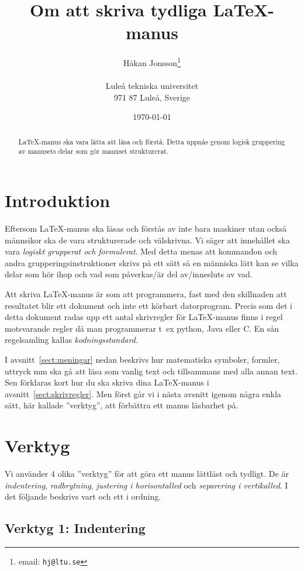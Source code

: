 \documentclass[a4paper,12pt]{article}
\title{Om att skriva tydliga \LaTeX-manus}
\author{Håkan Jonsson\thanks{email: \texttt{hj@ltu.se}} \\  
        ~ \\
        Luleå tekniska universitet \\ 
        971 87 Luleå, Sverige}
\date{\today}
\begin{document}
\linenumbers

\maketitle

\begin{abstract}
    \LaTeX-manus ska vara lätta att läsa och förstå. Detta uppnås genom
    logisk gruppering av manusets delar som gör manuset strukturerat. 
\end{abstract}

\section{Introduktion}

Eftersom \LaTeX-manus ska läsas och förstås av inte bara maskiner utan
också männsikor ska de vara strukturerade och välskrivna. Vi säger att
innehållet ska vara \emph{logiskt grupperat och formulerat}. Med detta
menas att kommandon och andra grupperingsinstruktioner skrivs på ett
sätt så en människa lätt kan se vilka delar som hör ihop och vad som
påverkas/är del av/innesluts av vad.

Att skriva \LaTeX-manus är som att programmera, fast med den
skillnaden att resultatet blir ett dokument och inte ett körbart
datorprogram. Precis som det i detta dokument radas upp ett antal
skrivregler för \LaTeX-manus finns i regel motsvarande regler då man
programmerar t~ex python, Java eller C. En sån regelsamling kallas
\emph{kodningsstandard}. 

I avsnitt~\ref{sect:meningar} nedan beskrivs hur matematiska symboler,
formler, uttryck mm ska gå att läsa som vanlig text och tillsammans
med alla annan text. Sen förklaras kort hur du ska skriva dina
\LaTeX-manus i avsnitt~\ref{sect:skrivregler}. Men först går vi i
nästa avsnitt igenom några enkla sätt, här kallade ''verktyg'', att
förbättra ett manus läsbarhet på. 

\section{Verktyg}

Vi använder 4 olika ''verktyg'' för att göra ett manus lättläst och
tydligt. De är \emph{indentering}, \emph{radbrytning}, \emph{justering
i horisontalled} och \emph{separering i vertikalled}. I det följande
beskrivs vart och ett i ordning.  

\subsection*{Verktyg 1: Indentering}
\end{document}
